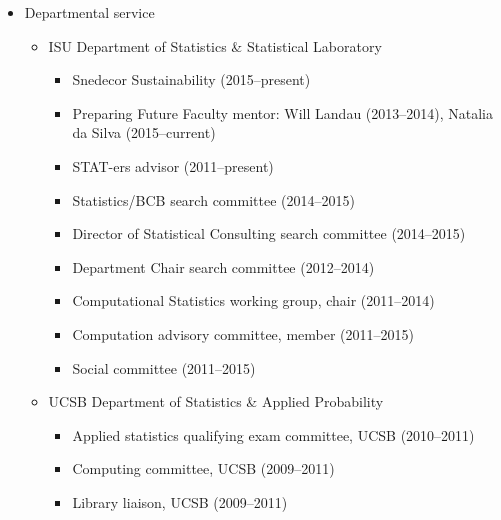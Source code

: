 \documentclass[overlapped,line]{res}
\begin{document}
\begin{resume}
\begin{itemize}
\item Departmental service
 	\begin{itemize}
	\item ISU Department of Statistics \& Statistical Laboratory
		\begin{itemize}
    \item Snedecor Sustainability (2015--present)
  	\item Preparing Future Faculty mentor: Will Landau (2013--2014), Natalia da Silva (2015--current)
  	\item STAT-ers advisor (2011--present)
		\item Statistics/BCB search committee (2014--2015)
		\item Director of Statistical Consulting search committee (2014--2015)
		\item Department Chair search committee (2012--2014)
		\item Computational Statistics working group, chair (2011--2014)
		\item Computation advisory committee, member (2011--2015)
		\item Social committee (2011--2015)
		\end{itemize}
	\item UCSB Department of Statistics \& Applied Probability
		\begin{itemize}
		\item Applied statistics qualifying exam committee, UCSB (2010--2011)
		\item Computing committee, UCSB (2009--2011)
		\item Library liaison, UCSB (2009--2011)
		\end{itemize}
 	\end{itemize}
\end{itemize}



{\small
      \begin{center}
		
		\end{center}

	    \begin{center}
		
		\end{center}
}



\end{resume}
\end{document}
